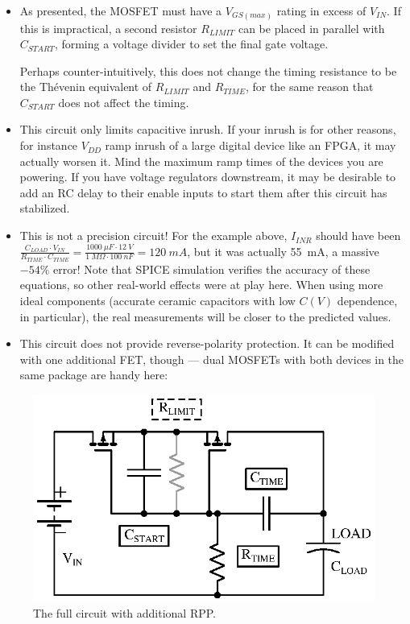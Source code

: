 \documentclass[letterpaper,12pt]{article}
\begin{document}
\begin{itemize}
\item{As presented, the MOSFET must have a $V_{GS(max)}$ rating in excess of $V_{IN}$.
If this is impractical, a second resistor $R_{LIMIT}$ can be placed in parallel with $C_{START}$,
forming a voltage divider to set the final gate voltage.

Perhaps counter-intuitively, this does not change the timing resistance to be the
Th\'evenin equivalent of $R_{LIMIT}$ and $R_{TIME}$, for the same reason that $C_{START}$ does
not affect the timing.}

\item{This circuit only limits capacitive inrush. If your inrush is for other reasons,
for instance $V_{DD}$ ramp inrush of a large digital device like an FPGA, it may actually
worsen it. Mind the maximum ramp times of the devices you are powering. If you have voltage
regulators downstream, it may be desirable to add an RC delay to their enable inputs to start
them after this circuit has stabilized.}

\item{This is not a precision circuit! For the example above, $I_{INR}$ should have been
$\frac{C_{LOAD} \cdot V_{IN}}{R_{TIME} \cdot C_{TIME}} = \frac{\SI{1000}{\mu F} \cdot \SI{12}{V}}{\SI{1}{M\Omega} \cdot \SI{100}{nF}} = \SI{120}{mA} $,
but it was actually \SI{55}{mA}, a massive $-54\%$ error! Note that SPICE simulation verifies the
accuracy of these equations, so other real-world effects were at play here. When using more ideal
components (accurate ceramic capacitors with low $C(V)$ dependence, in particular), the real measurements
will be closer to the predicted values.}

\item{This circuit does not provide reverse-polarity protection. It can be modified with one
additional FET, though --- dual MOSFETs with both devices in the same package are handy here:}
\end{itemize}

\begin{figure}[H]
\centering
\includegraphics{with_rpp}
\caption{The full circuit with additional RPP.}
\end{figure}
\end{document}
